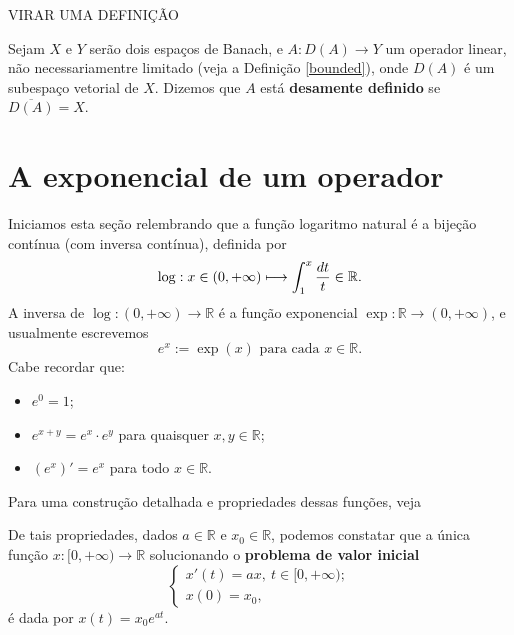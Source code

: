 {\color{red}VIRAR UMA DEFINIÇÃO}
\begin{definition}
Sejam $X$ e $Y$ serão dois espaços de Banach, e $A:D(A)\longrightarrow Y$ um operador linear, não necessariamentre limitado (veja a Definição \ref{bounded}), onde $D(A)$ é um subespaço vetorial de $X$. Dizemos que $A$ está \textbf{desamente definido} se $\overline{D(A)}=X$.
\end{definition}

\section{A exponencial de um operador}

Iniciamos esta seção relembrando que a função logaritmo natural é a bijeção contínua (com inversa contínua), definida por
\[
\displaystyle \log : x\in (0,+\infty ) \longmapsto \int_{1}^{x} \frac{dt}{t} \in \mathbb {\mathbb{R}}.
\]
A inversa de $\log :(0,+\infty ) \longrightarrow \mathbb R$ é a função exponencial $\exp :\mathbb R \longrightarrow (0,+\infty)$, e usualmente escrevemos 
\[
\displaystyle e^{x} :=\exp(x) \text{  para cada } x\in \mathbb R.
\]
Cabe recordar que:
\begin{itemize}
\item $e^{0}=1$;
\item $e^{x+y} = e^x \cdot e^{y}$ para quaisquer $x,y\in \mathbb R$;
\item $(e^x)' = e^x$ para todo $x\in \mathbb R$. 
\end{itemize}
Para uma construção detalhada e propriedades dessas funções, veja \cite[Cap. 6]{figueiredo1996analise}

De tais propriedades, dados $a\in \mathbb R$ e $x_0 \in \mathbb R$, podemos constatar que a única função $x:[0,+\infty) \longrightarrow \mathbb R$ solucionando o \textbf{problema de valor inicial}
\[
\begin{cases}
    x'(t)=ax,\ t\in [0,+\infty);\\
    x(0)=x_0,
\end{cases}
\]
é dada por $x(t)=x_0 e^{at}$. 

